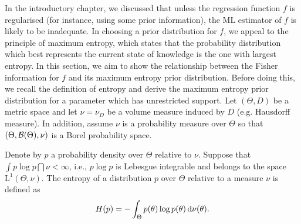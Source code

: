 In the introductory chapter, we discussed that unless the regression function $f$ is regularised (for instance, using some prior information), the ML estimator of $f$ is likely to be inadequate.
In choosing a prior distribution for $f$, we appeal to the principle of maximum entropy, which states that the probability distribution which best represents the current state of knowledge is the one with largest entropy.
In this section, we aim to show the relationship between the Fisher information for $f$ and its maximum entropy prior distribution.
Before doing this, we recall the definition of entropy and derive the maximum entropy prior distribution for a parameter which has unrestricted support.
Let $(\Theta,D)$ be a metric space and let $\nu = \nu_D$ be a volume measure induced by $D$ (e.g. Hausdorff measure).
In addition, assume $\nu$ is a probability measure over $\Theta$ so that $(\Theta,{\mathcal B}(\Theta),\nu)$ is a Borel probability space.

\begin{definition}[Entropy]
  Denote by $p$ a probability density over $\Theta$ relative to $\nu$.
  Suppose that $\int p\log p \dint \nu < \infty$, i.e., $p \log p$ is Lebesgue integrable and belongs to the space $\text{L}^1(\Theta,\nu)$.
  The entropy of a distribution $p$ over $\Theta$ relative to a measure $\nu$ is defined as
  \[
    H(p) = - \int_\Theta p(\theta) \log p(\theta) \, \text{d}\nu(\theta).
  \]
\end{definition}



